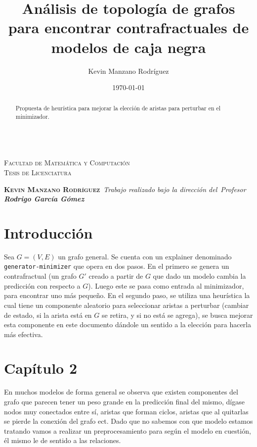 \documentclass[11pt,letterpaper]{report} \usepackage[utf8]{inputenc} \usepackage[spanish]{babel}
\title{An\'alisis de topolog\'ia de grafos para encontrar contrafractuales de modelos de caja negra}
\author{Kevin Manzano Rodríguez}
\date{\today} %
\begin{document}
\maketitle

\thispagestyle{empty} \\{\scshape\LARGE Facultad de Matem\'atica y Computaci\'on}\\ {\scshape\LARGE Tesis de Licenciatura}\ \bigskip \par\vspace{4cm} {\scshape\LARGE \textbf{Kevin Manzano Rodr\'iguez}}\ \medskip \textit{Trabajo realizado bajo la dirección del}\ \textit{Profesor \textbf{Rodrigo Garc\'ia G\'omez}}\ \vspace*{2cm}

\begin{abstract} \centering \large Propuesta de heur\'istica para mejorar la elecci\'on de aristas para perturbar en el minimizador. \end{abstract}

\tableofcontents \newpage

\chapter{Introducción} 
Sea $G=(V,E)$ un grafo general. Se cuenta con un explainer denominado \texttt{generator-minimizer} que opera en dos pasos. En el primero se genera un contrafractual (un grafo $G'$ creado a partir de $G$ que dado un modelo cambia la predicci\'on con respecto a $G$). Luego este se pasa como entrada al minimizador, para encontrar uno m\'as pequeño. En el segundo paso, se utiliza una heur\'istica la cual tiene un componente aleatorio para seleccionar aristas a perturbar (cambiar de estado, si la arista est\'a en $G$ se retira, y si no est\'a se agrega), se busca mejorar esta componente en este documento d\'andole un sentido a la elecci\'on para hacerla m\'as efectiva.

\chapter{Capítulo 2}

En muchos modelos de forma general se observa que existen componentes del grafo que parecen tener un peso grande en la predicci\'on final del mismo, d\'igase nodos muy conectados entre s\'i, aristas que forman ciclos, aristas que al quitarlas se pierde la conexi\'on del grafo ect. Dado que no sabemos con que modelo estamos tratando vamos a realizar un preprocesamiento para seg\'un el modelo en cuesti\'on, \'el mismo le de sentido a las relaciones.\\
\end{document}

